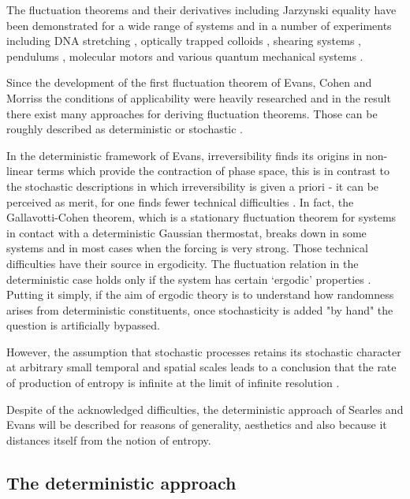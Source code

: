 \documentclass[a4paper,12pt]{article}
\begin{document}
The fluctuation theorems and their derivatives including Jarzynski equality have been demonstrated for a wide range of systems and in a number of experiments including DNA stretching \cite{Collin:2005fx}, optically trapped colloids \cite{Carberry:2007be}, shearing systems \cite{Evans:1993bl}, pendulums \cite{Ciliberto:2010jg}, molecular motors \cite{Seifert:2005it} and various quantum mechanical systems \cite{Monnai:2005ke}.

Since the development of the first fluctuation theorem of Evans, Cohen and Morriss the conditions of applicability were heavily researched and in the result there exist many approaches for deriving fluctuation theorems. 
Those can be roughly described as deterministic \cite{Evans:2002gg, Evans:2241458} or stochastic \cite{Kurchan:1998, Searles:1999fz}.

In the deterministic framework of Evans, irreversibility finds its origins in non-linear terms which provide the contraction of phase space, this is in contrast to the stochastic descriptions in which irreversibility is given a priori - it can be perceived as merit, for one finds fewer technical difficulties \cite{Crooks:2008ta}. 
In fact, the Gallavotti-Cohen theorem, which is a stationary fluctuation theorem for systems in contact with a deterministic Gaussian thermostat, breaks down in some systems and in most cases when the forcing is very strong.  
Those technical difficulties have their source in ergodicity. The fluctuation relation in the deterministic case holds only if the system has certain ‘ergodic’ properties \cite{Kurchan:2009ub}. Putting it simply, if the aim of ergodic theory is to understand how randomness arises from deterministic constituents, once stochasticity is added "by hand" the question is artificially bypassed. 

However, the assumption that stochastic processes retains its stochastic character at arbitrary small temporal and spatial scales leads to a conclusion that the rate of production of entropy is infinite at the limit of infinite resolution \cite{Dorfman:ozm67-zD}.

Despite of the acknowledged difficulties, the deterministic approach of Searles and Evans will be described for reasons of generality, aesthetics and also because it distances itself from the notion of entropy.

\subsection{The deterministic approach}
\end{document}

